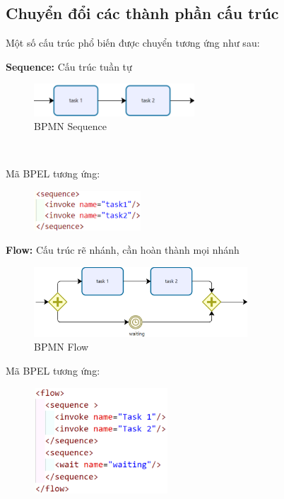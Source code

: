 \subsection{Chuyển đổi các thành phần cấu trúc}
Một số cấu trúc phổ biến được chuyển tương ứng như sau:\\
\par \textbf{Sequence:} Cấu trúc tuần tự
\begin{figure}[!htp]
    \begin{center}
        \includegraphics[width=6cm]{img/Theory/tranfer/Sequence.png}
    \end{center}
    \caption{BPMN Sequence}
\end{figure}
\\
\par Mã BPEL tương ứng:
\begin{figure}[!htp]
    \begin{center}
        \includegraphics[width=4cm]{img/Theory/tranfer/SequenceCode.png}
    \end{center}
\end{figure}

\textbf{Flow:} Cấu trúc rẽ nhánh, cần hoàn thành mọi nhánh
\begin{figure}[!htp]
    \begin{center}
        \includegraphics[width=8cm]{img/Theory/tranfer/flow.png}
    \end{center}
    \caption{BPMN Flow}
\end{figure}
\newpage
\par Mã BPEL tương ứng:
\begin{figure}[!htp]
    \begin{center}
        \includegraphics[width=5cm]{img/Theory/tranfer/flowCode.png}
    \end{center}
\end{figure}

